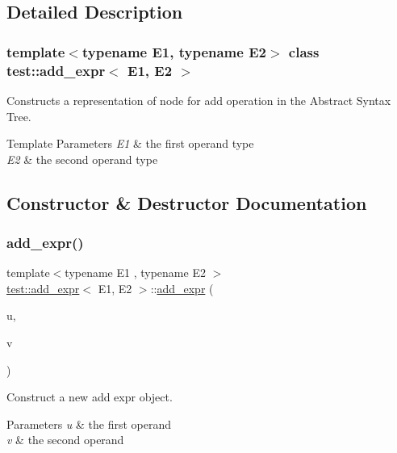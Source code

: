 \subsection{Detailed Description}
\subsubsection*{template$<$typename E1, typename E2$>$\newline
class test\+::add\+\_\+expr$<$ E1, E2 $>$}

Constructs a representation of node for add operation in the Abstract Syntax Tree. 


\begin{DoxyTemplParams}{Template Parameters}
{\em E1} & the first operand type \\
\hline
{\em E2} & the second operand type \\
\hline
\end{DoxyTemplParams}


\subsection{Constructor \& Destructor Documentation}
\mbox{\label{classtest_1_1add__expr_a1c76d0d18615c7ddabb4323a7ea4c885}} 
\subsubsection{\texorpdfstring{add\_expr()}{add\_expr()}}
{\footnotesize\ttfamily template$<$typename E1 , typename E2 $>$ \\
\mbox{\hyperlink{classtest_1_1add__expr}{test\+::add\+\_\+expr}}$<$ E1, E2 $>$\+::\mbox{\hyperlink{classtest_1_1add__expr}{add\+\_\+expr}} (\begin{DoxyParamCaption}\item[{E1 const \&}]{u,  }\item[{E2 const \&}]{v }\end{DoxyParamCaption})\hspace{0.3cm}{\ttfamily [inline]}}



Construct a new add expr object. 


\begin{DoxyParams}{Parameters}
{\em u} & the first operand \\
\hline
{\em v} & the second operand \\
\hline
\end{DoxyParams}


